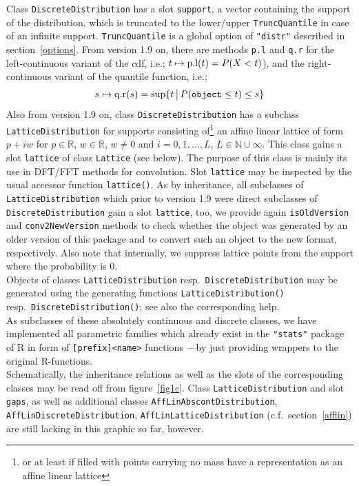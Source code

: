 \documentclass[11pt]{article}
\newcommand{\code}[1]{{\tt #1}}
\newcommand{\pkg}[1]{{\tt "#1"}}
\newcommand{\R}{\mathbb{R}}
\newcommand{\N}{\mathbb{N}}
\begin{document}
Class \code{DiscreteDistribution} has a slot \code{support}, a vector containing 
the support of the distribution, which is truncated to the lower/upper 
\code{TruncQuantile} in case of an infinite support. \code{TruncQuantile} is a 
global option of  \pkg{distr} described in section~{\ref{options}}. 
From version 1.9 on, there are methods \code{p.l} and \code{q.r} for the 
left-continuous variant of the cdf, i.e.; $t\mapsto {\rm p.l}(t)=P(X<t)$), and the 
right-continuous variant of the quantile function, i.e.;
$$
s\mapsto {\rm q.r}(s)=\sup\{t \,\big|\, P({\tt object}\leq t)\leq s\}
$$
Also from version 1.9 on, class \code{DiscreteDistribution} has a subclass 
\code{LatticeDistribution} for supports consisting of\footnote{or at least
if filled with points carrying no mass have a representation as an affine linear 
lattice} an affine linear lattice of form $p+iw$ for $p\in\R$, $w\in\R$, 
$w\not=0$ and $i=0,1,\ldots,L$, 
$L\in\N \cup\infty$. This class gains a slot \code{lattice} of 
class \code{Lattice} (see below). The purpose of this class is mainly its use 
in DFT/FFT methods for convolution. Slot \code{lattice} may be 
inspected by the usual accessor function \code{lattice()}.
As by inheritance, all subclasses of \code{LatticeDistribution} which prior to
version 1.9 were direct subclasses of \code{DiscreteDistribution} gain a 
slot \code{lattice}, too, we provide again \code{isOldVersion} and 
\code{conv2NewVersion} methods to check whether the object was generated by an 
older version of this package and to convert such an object to the new 
format, respectively. Also note that internally, we suppress lattice points from 
the support where the probability is $0$.\\        


Objects of classes \code{LatticeDistribution} resp.\ 
\code{DiscreteDistribution} may be generated using the generating functions
\code{LatticeDistribution()} resp.\ \code{DiscreteDistribution()}; see also
the corresponding help.
\\
As subclasses of these absolutely continuous and discrete classes, we have 
implemented all parametric families which already exist in the  \pkg{stats} 
package of {\sf R} in form of 
{\tt [prefix]<name>} functions ---by just providing wrappers to the original 
{\sf R}-functions.\\
%
Schematically, the inheritance relations as well as the slots 
of  the corresponding classes may be read off from figure~\ref{fig1c}. 
Class \code{LatticeDistribution} and slot \code{gaps}, as well as
additional classes \code{AffLinAbscontDistribution}, 
\code{AffLinDiscreteDistribution}, \code{AffLinLatticeDistribution} 
(c.f.\ section~\ref{afflin}) are still lacking in this graphic so far, however.
\\
\end{document}
